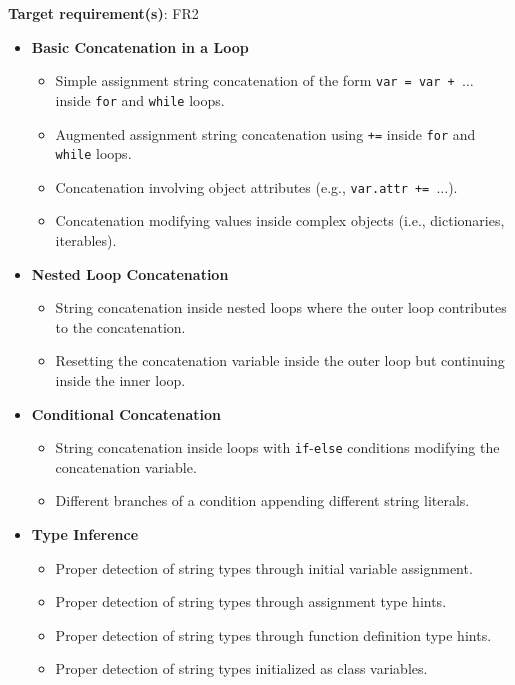 \documentclass[12pt, titlepage]{article}
\begin{document}
\begin{enumerate}[label={\bf \textcolor{Maroon}{test-SRT-\arabic*}}, wide=0pt, font=\itshape]
\noindent\textbf{Target requirement(s)}: FR2~\cite{SRS} \\

\begin{itemize}
  \item \textbf{Basic Concatenation in a Loop}
  \begin{itemize}
      \item Simple assignment string concatenation of the form \texttt{var = var + \( \ldots \)} inside \texttt{for} and \texttt{while} loops.
      \item Augmented assignment string concatenation using \texttt{+=} inside \texttt{for} and \texttt{while} loops.
      \item Concatenation involving object attributes (e.g., \texttt{var.attr += \( \ldots \)}).
      \item Concatenation modifying values inside complex objects (i.e., dictionaries, iterables).
  \end{itemize}
  
  \item \textbf{Nested Loop Concatenation}
  \begin{itemize}
      \item String concatenation inside nested loops where the outer loop contributes to the concatenation.
      \item Resetting the concatenation variable inside the outer loop but continuing inside the inner loop.
  \end{itemize}

  \item \textbf{Conditional Concatenation}
  \begin{itemize}
      \item String concatenation inside loops with \texttt{if}-\texttt{else} conditions modifying the concatenation variable.
      \item Different branches of a condition appending different string literals.
  \end{itemize}

  \item \textbf{Type Inference}
  \begin{itemize}
      \item Proper detection of string types through initial variable assignment.
      \item Proper detection of string types through assignment type hints.
      \item Proper detection of string types through function definition type hints.
      \item Proper detection of string types initialized as class variables.
  \end{itemize}


\end{itemize}
\end{enumerate}
\end{document}
